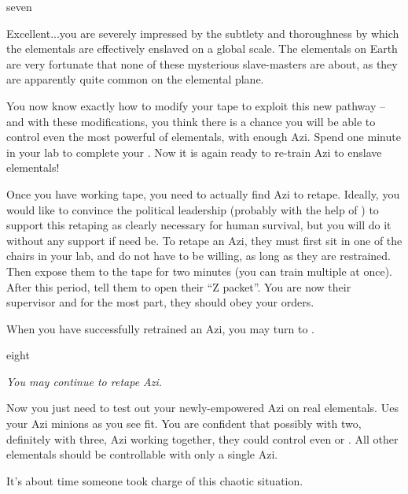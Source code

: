 \documentclass[notebook]{elementals}
\begin{document}
\begin{page}{seven}

Excellent...you are severely impressed by the subtlety and thoroughness by which the elementals are effectively enslaved on a global scale. The elementals on Earth are very fortunate that none of these mysterious slave-masters are about, as they are apparently quite common on the elemental plane.

You now know exactly how to modify your tape to exploit this new pathway -- and with these modifications, you think there is a chance you will be able to control even the most powerful of elementals, with enough Azi. Spend one minute in your lab to complete your \iAziTape{}. Now it is again ready to re-train Azi to enslave elementals!

Once you have working tape, you need to actually find Azi to retape. Ideally, you would like to convince the political leadership (probably with the help of \cDema{}) to support this retaping as clearly necessary for human survival, but you will do it without any support if need be. To retape an Azi, they must first sit in one of the chairs in your lab, and do not have to be willing, as long as they are restrained. Then expose them to the tape for two minutes (you can train multiple at once). After this period, tell them to open their ``Z packet''. You are now their supervisor and for the most part, they should obey your orders.

When you have successfully retrained an Azi, you may turn to .

\end{page}

\begin{page}{eight}

\emph{You may continue to retape Azi.}

Now you just need to test out your newly-empowered Azi on real elementals. Ues your Azi minions as you see fit. You are confident that possibly with two, definitely with three, Azi working together, they could control even \cQueen{} or \cKing{}. All other elementals should be controllable with only a single Azi.

It's about time someone took charge of this chaotic situation.

\end{page}

\endnotebook
\end{document}
